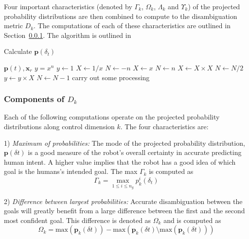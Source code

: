 Four important characteristics (denoted by $\Gamma_k$, $\Omega_k$, $\Lambda_k$ and $\Upsilon_k$) of the projected probability distributions are then combined to compute to the disambiguation metric $D_k$. The computations of each of these characteristics are outlined in Section~\ref{sssec:components}. The algorithm is outlined in 
\begin{algorithm}
	\caption{Calculate $\boldsymbol{p}(\delta_t)$}
	\label{alg1}
	\begin{algorithmic}
		\REQUIRE $\boldsymbol{p}(t), \boldsymbol{x}_r$
		\ENSURE $y = x^n$
		\STATE $y \leftarrow 1$
		\STATE $X \leftarrow 1 / x$
		\STATE $N \leftarrow -n$
		\ELSE
		\STATE $X \leftarrow x$
		\STATE $N \leftarrow n$
		\ENDIF
		\STATE $X \leftarrow X \times X$
		\STATE $N \leftarrow N / 2$
		\ELSE[$N$ is odd]
		\STATE $y \leftarrow y \times X$
		\STATE $N \leftarrow N - 1$
		\STATE carry out some processing
		\ENDFOR
		\ENDIF
		\ENDWHILE
	\end{algorithmic}
\end{algorithm}

\subsubsection{Components of $D_k$}\label{sssec:components}
Each of the following computations operate on the projected probability distributions along control dimension $k$. The four characteristics are:

1) \textit{Maximum of probabilities:} The mode of the projected probability distribution, $\boldsymbol{p}(\delta t)$  is a good measure of the robot's overall certainty in accurate predicting human intent. A higher value implies that the robot has a good idea of which goal is the humans's intended goal. The max $\Gamma_k$ is computed as
\begin{equation*}
\Gamma_k = \max\limits_{1 \leq i \leq n_g}p^i_k(\delta_t)
\end{equation*}

2) \textit{Difference between largest probabilities:} Accurate disambiguation between the goals will greatly benefit from a large difference between the first and the second most confident goal. This difference is denoted as $\Omega_k$ and is computed as
\begin{equation*}
\Omega_k = \text{max}(\boldsymbol{p}_k(\delta t)) - \text{max}(\boldsymbol{p}_k(\delta t) \setminus \text{max}(\boldsymbol{p}_k(\delta t)))
\end{equation*}

